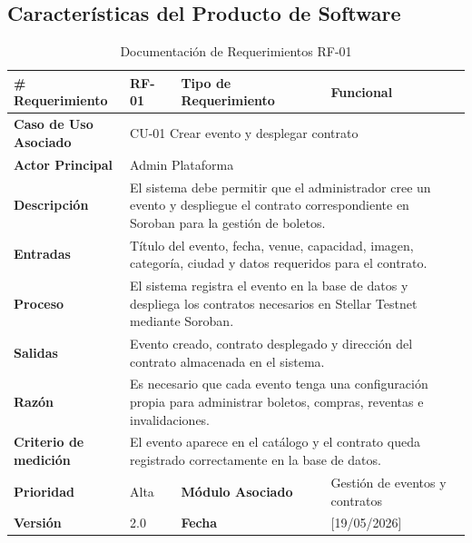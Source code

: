 \documentclass[12pt,letterpaper]{article}
\begin{document}
\subsection{Características del Producto de Software}
\begin{table}[H]
\centering
\scriptsize
\renewcommand{\arraystretch}{1.05}
\setlength{\tabcolsep}{3pt}

\newlength{\anchocelda}
\setlength{\anchocelda}{\dimexpr\textwidth-2.7cm-8\tabcolsep-5\arrayrulewidth\relax}

\begin{tabularx}{\textwidth}{|p{2.7cm}|X|p{2.8cm}|X|}
\hline
\textbf{\# Requerimiento} & RF-01 & \textbf{Tipo de Requerimiento} & Funcional \\ \hline

\textbf{Caso de Uso Asociado} & 
\multicolumn{3}{p{\anchocelda}|}{CU-01 Crear evento y desplegar contrato} \\ \hline

\textbf{Actor Principal} & 
\multicolumn{3}{p{\anchocelda}|}{Admin Plataforma} \\ \hline

\textbf{Descripción} & 
\multicolumn{3}{p{\anchocelda}|}{El sistema debe permitir que el administrador cree un evento y despliegue el contrato correspondiente en Soroban para la gestión de boletos.} \\ \hline

\textbf{Entradas} & 
\multicolumn{3}{p{\anchocelda}|}{Título del evento, fecha, venue, capacidad, imagen, categoría, ciudad y datos requeridos para el contrato.} \\ \hline

\textbf{Proceso} & 
\multicolumn{3}{p{\anchocelda}|}{El sistema registra el evento en la base de datos y despliega los contratos necesarios en Stellar Testnet mediante Soroban.} \\ \hline

\textbf{Salidas} & 
\multicolumn{3}{p{\anchocelda}|}{Evento creado, contrato desplegado y dirección del contrato almacenada en el sistema.} \\ \hline

\textbf{Razón} & 
\multicolumn{3}{p{\anchocelda}|}{Es necesario que cada evento tenga una configuración propia para administrar boletos, compras, reventas e invalidaciones.} \\ \hline

\textbf{Criterio de medición} & 
\multicolumn{3}{p{\anchocelda}|}{El evento aparece en el catálogo y el contrato queda registrado correctamente en la base de datos.} \\ \hline

\textbf{Prioridad} & Alta & \textbf{Módulo Asociado} & Gestión de eventos y contratos \\ \hline

\textbf{Versión} & 2.0 & \textbf{Fecha} & [19/05/2026] \\ \hline

\end{tabularx}

\caption{Documentación de Requerimientos RF-01}
\label{tab:documentacion_requerimientos_rf01}
\normalsize
\end{table}
\end{document}
